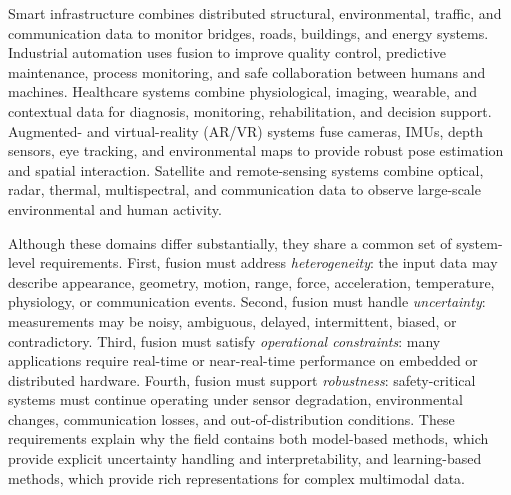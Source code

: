 \documentclass[graybox,envcountchap]{style/SNmono}
\begin{document}
Smart infrastructure combines distributed structural, environmental, traffic, and communication data to monitor bridges, roads, buildings, and energy systems. Industrial automation uses fusion to improve quality control, predictive maintenance, process monitoring, and safe collaboration between humans and machines. Healthcare systems combine physiological, imaging, wearable, and contextual data for diagnosis, monitoring, rehabilitation, and decision support. Augmented- and virtual-reality (AR/VR) systems fuse cameras, IMUs, depth sensors, eye tracking, and environmental maps to provide robust pose estimation and spatial interaction. Satellite and remote-sensing systems combine optical, radar, thermal, multispectral, and communication data to observe large-scale environmental and human activity.

Although these domains differ substantially, they share a common set of system-level requirements. First, fusion must address \emph{heterogeneity}: the input data may describe appearance, geometry, motion, range, force, acceleration, temperature, physiology, or communication events. Second, fusion must handle \emph{uncertainty}: measurements may be noisy, ambiguous, delayed, intermittent, biased, or contradictory. Third, fusion must satisfy \emph{operational constraints}: many applications require real-time or near-real-time performance on embedded or distributed hardware. Fourth, fusion must support \emph{robustness}: safety-critical systems must continue operating under sensor degradation, environmental changes, communication losses, and out-of-distribution conditions. These requirements explain why the field contains both model-based methods, which provide explicit uncertainty handling and interpretability, and learning-based methods, which provide rich representations for complex multimodal data.
\end{document}
